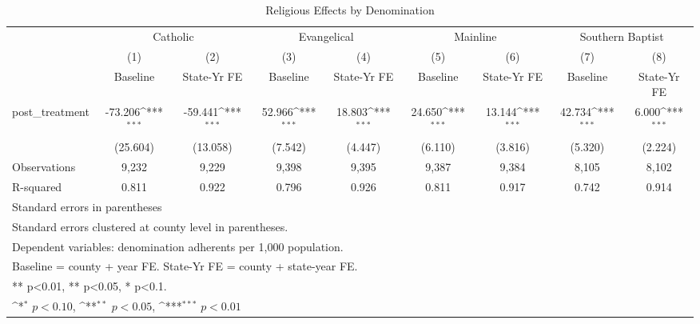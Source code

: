 \begin{table}[htbp]\centering
\def\sym#1{\ifmmode^{#1}\else\(^{#1}\)\fi}
\caption{Religious Effects by Denomination}
\begin{tabular}{l*{8}{c}}
\hline\hline
            &\multicolumn{2}{c}{Catholic}               &\multicolumn{2}{c}{Evangelical}            &\multicolumn{2}{c}{Mainline}               &\multicolumn{2}{c}{Southern Baptist}       \\\cmidrule(lr){2-3}\cmidrule(lr){4-5}\cmidrule(lr){6-7}\cmidrule(lr){8-9}
            &\multicolumn{1}{c}{(1)}&\multicolumn{1}{c}{(2)}&\multicolumn{1}{c}{(3)}&\multicolumn{1}{c}{(4)}&\multicolumn{1}{c}{(5)}&\multicolumn{1}{c}{(6)}&\multicolumn{1}{c}{(7)}&\multicolumn{1}{c}{(8)}\\
            &\multicolumn{1}{c}{Baseline}&\multicolumn{1}{c}{State-Yr FE}&\multicolumn{1}{c}{Baseline}&\multicolumn{1}{c}{State-Yr FE}&\multicolumn{1}{c}{Baseline}&\multicolumn{1}{c}{State-Yr FE}&\multicolumn{1}{c}{Baseline}&\multicolumn{1}{c}{State-Yr FE}\\
\hline
post\_treatment&     -73.206\sym{***}&     -59.441\sym{***}&      52.966\sym{***}&      18.803\sym{***}&      24.650\sym{***}&      13.144\sym{***}&      42.734\sym{***}&       6.000\sym{***}\\
            &    (25.604)         &    (13.058)         &     (7.542)         &     (4.447)         &     (6.110)         &     (3.816)         &     (5.320)         &     (2.224)         \\
\hline
Observations&       9,232         &       9,229         &       9,398         &       9,395         &       9,387         &       9,384         &       8,105         &       8,102         \\
R-squared   &       0.811         &       0.922         &       0.796         &       0.926         &       0.811         &       0.917         &       0.742         &       0.914         \\
\hline\hline
\multicolumn{9}{l}{\footnotesize Standard errors in parentheses}\\
\multicolumn{9}{l}{\footnotesize Standard errors clustered at county level in parentheses.}\\
\multicolumn{9}{l}{\footnotesize Dependent variables: denomination adherents per 1,000 population.}\\
\multicolumn{9}{l}{\footnotesize Baseline = county + year FE. State-Yr FE = county + state-year FE.}\\
\multicolumn{9}{l}{\footnotesize *** p<0.01, ** p<0.05, * p<0.1.}\\
\multicolumn{9}{l}{\footnotesize \sym{*} \(p<0.10\), \sym{**} \(p<0.05\), \sym{***} \(p<0.01\)}\\
\end{tabular}
\end{table}
